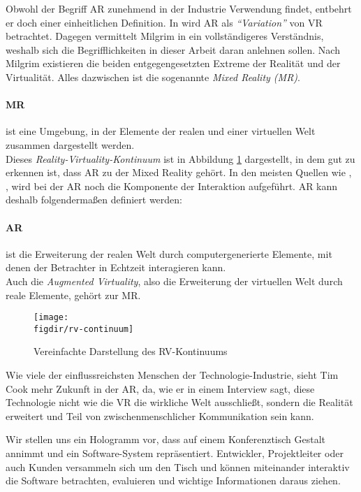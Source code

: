 Obwohl der Begriff AR zunehmend in der Industrie Verwendung findet, entbehrt er doch einer einheitlichen Definition. In \cite{azuma1997survey} wird AR als \emph{"`Variation"'} von VR betrachtet. Dagegen vermittelt Milgrim in \cite{milgram1995augmented} ein vollständigeres Verständnis, weshalb sich die Begrifflichkeiten in dieser Arbeit daran anlehnen sollen. Nach Milgrim existieren die beiden entgegengesetzten Extreme der Realität und der Virtualität. Alles dazwischen ist die sogenannte \emph{Mixed Reality (MR)}.

\paragraph{MR} ist eine Umgebung, in der Elemente der realen und einer virtuellen Welt zusammen dargestellt werden.\\

Dieses \emph{Reality-Virtuality-Kontinuum} ist in Abbildung \ref{fig:rv-continuum} dargestellt, in dem gut zu erkennen ist, dass AR zu der Mixed Reality gehört. In den meisten Quellen wie \cite{azuma1997survey}, \cite{azuma2001recent}, \cite{kato1999marker} wird bei der AR noch die Komponente der Interaktion aufgeführt. AR kann deshalb folgendermaßen definiert werden:

\paragraph{AR} ist die Erweiterung der realen Welt durch computergenerierte Elemente, mit denen der Betrachter in Echtzeit interagieren kann.\\

Auch die \emph{Augmented Virtuality}, also die Erweiterung der virtuellen Welt durch reale Elemente, gehört zur MR.

\begin{figure}[htb]
  \texttt{[image: \\figdir/rv-continuum]}
  \caption{Vereinfachte Darstellung des RV-Kontinuums \cite{milgram1995augmented}}
  \label{fig:rv-continuum}
\end{figure}

Wie viele der einflussreichsten Menschen der Technologie-Industrie, sieht Tim Cook  mehr Zukunft in der AR, da, wie er in einem Interview sagt, diese Technologie nicht wie die VR die wirkliche Welt ausschließt, sondern die Realität erweitert und Teil von zwischenmenschlicher Kommunikation sein kann. \cite{theindependent2017apple}

Wir stellen uns ein Hologramm vor, dass auf einem Konferenztisch Gestalt annimmt und ein Software-System repräsentiert. Entwickler, Projektleiter oder auch Kunden versammeln sich um den Tisch und können miteinander interaktiv die Software betrachten, evaluieren und wichtige Informationen daraus ziehen.

